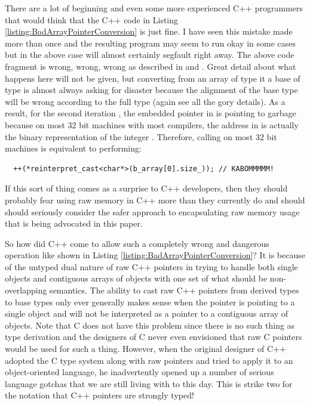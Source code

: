 \documentclass[pdf,ps2pdf,11pt]{SANDreport}
\begin{document}
There are a lot of beginning and even some more experienced C++
programmers that would think that the C++ code in Listing
{}\ref{listing:BadArrayPointerConversion} is just fine.  I have seen
this mistake made more than once and the resulting program may seem to
run okay in some cases but in the above case will almost certainly
segfault right away.  The above code fragment is wrong, wrong, wrong
as described in {}\cite[Gotcha \#33]{C++Gotchas03} and {}\cite[Item
\#100]{C++CodingStandards05}.  Great detail about
what happens here will not be given, but converting from an array of
type {} it a base of type {} is almost always asking for
disaster because the alignment of the base type {} will be
wrong according to the full type {} (again see {}\cite[Gotcha
\#33]{C++Gotchas03} all the gory details).  As a result, for the
second iteration {}, the embedded pointer in
{} is pointing to garbage because on
most 32 bit machines with most compilers, the address in
{} is actually the binary
representation of the integer {}.
Therefore, calling {} on most 32 bit
machines is equivalent to performing:

{\small\begin{verbatim}
  ++(*reinterpret_cast<char*>(b_array[0].size_)); // KABOMMMMM!
\end{verbatim}}

If this sort of thing comes as a surprise to C++ developers, then they
should probably fear using raw memory in C++ more than they currently
do and should should seriously consider the safer approach to
encapsulating raw memory usage that is being advocated in this paper.

So how did C++ come to allow such a completely wrong and dangerous
operation like shown in Listing
{}\ref{listing:BadArrayPointerConversion}?  It is because of the
untyped dual nature of raw C++ pointers in trying to handle both
single objects and contiguous arrays of objects with one set of what
should be non-overlapping semantics.  The ability to cast raw C++
pointers from derived types to base types only ever generally makes
sense when the pointer is pointing to a single object and will not be
interpreted as a pointer to a contiguous array of objects.  Note that
C does not have this problem since there is no such thing as type
derivation and the designers of C never even envisioned that raw C
pointers would be used for such a thing.  However, when the original
designer of C++ adopted the C type system along with raw pointers and
tried to apply it to an object-oriented language, he inadvertently
opened up a number of serious language gotchas that we are still
living with to this day.  This is strike two for the notation that C++
pointers are strongly typed!
\end{document}

